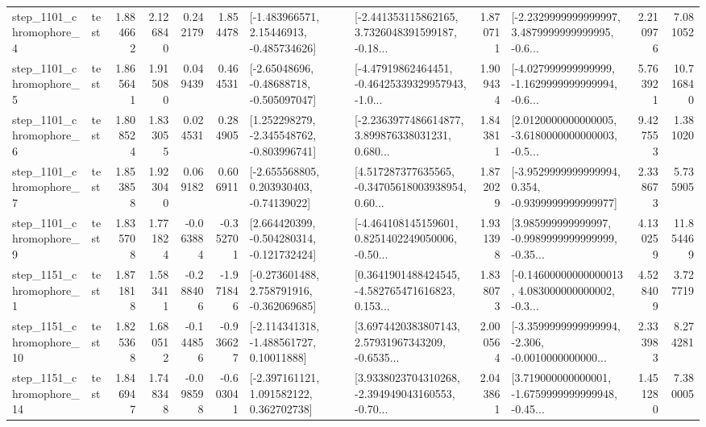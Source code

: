\begin{tabular}{llrrrrllrlrr}
  step\_1101\_chromophore\_4 &      test &      1.884662 &    2.126840 &      0.242179 &  1.854478 &    [-1.483966571, 2.15446913, -0.485734626] &  [-2.441353115862165, 3.7326048391599187, -0.18... &       1.870711 &  [-2.2329999999999997, 3.4879999999999995, -0.6... &            2.210976 &          7.081052 \\
  step\_1101\_chromophore\_5 &      test &      1.865641 &    1.915080 &      0.049439 &  0.464531 &    [-2.65048696, -0.48688718, -0.505097047] &  [-4.47919862464451, -0.46425339329957943, -1.0... &       1.909434 &  [-4.027999999999999, -1.1629999999999994, -0.6... &            5.763921 &         10.716840 \\
  step\_1101\_chromophore\_6 &      test &      1.808524 &    1.833055 &      0.024531 &  0.284905 &   [1.252298279, -2.345548762, -0.803996741] &  [-2.2363977486614877, 3.899876338031231, 0.680... &       1.843811 &  [2.0120000000000005, -3.6180000000000003, -0.5... &            9.427553 &          1.381020 \\
  step\_1101\_chromophore\_7 &      test &      1.853858 &    1.923040 &      0.069182 &  0.606911 &    [-2.655568805, 0.203930403, -0.74139022] &  [4.517287377635565, -0.34705618003938954, 0.60... &       1.872029 &  [-3.9529999999999994, 0.354, -0.9399999999999977] &            2.338673 &          5.735905 \\
  step\_1101\_chromophore\_9 &      test &      1.835708 &    1.771824 &     -0.063884 & -0.352701 &   [2.664420399, -0.504280314, -0.121732424] &  [-4.464108145159601, 0.8251402249050006, -0.50... &       1.931398 &  [3.985999999999997, -0.9989999999999999, -0.35... &            4.130259 &         11.854469 \\
  step\_1151\_chromophore\_1 &      test &      1.871818 &    1.583411 &     -0.288406 & -1.971846 &   [-0.273601488, 2.758791916, -0.362069685] &  [0.3641901488424545, -4.582765471616823, 0.153... &       1.838073 &  [-0.14600000000000013, 4.083000000000002, -0.3... &            4.528409 &          3.727719 \\
 step\_1151\_chromophore\_10 &      test &      1.825368 &    1.680512 &     -0.144856 & -0.936627 &    [-2.114341318, -1.488561727, 0.10011888] &  [3.6974420383807143, 2.57931967343209, -0.6535... &       2.000564 &  [-3.3599999999999994, -2.306, -0.0010000000000... &            2.333983 &          8.274281 \\
 step\_1151\_chromophore\_14 &      test &      1.846947 &    1.748348 &     -0.098598 & -0.603041 &    [-2.397161121, 1.091582122, 0.362702738] &  [3.9338023704310268, -2.394949043160553, -0.70... &       2.043861 &  [3.719000000000001, -1.6759999999999948, -0.45... &            1.451280 &          7.380005 \\

\end{tabular}
